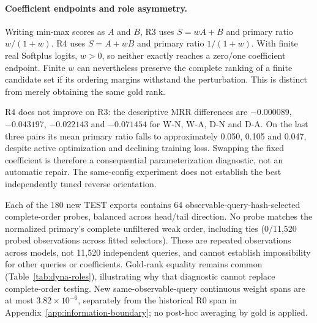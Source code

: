 \documentclass[11pt,a4paper]{article}
\begin{document}
\paragraph{Coefficient endpoints and role asymmetry.}
Writing min-max scores as $A$ and $B$, R3 uses $S=wA+B$ and primary ratio $w/(1+w)$. R4 uses $S=A+wB$ and primary ratio $1/(1+w)$. With finite real Softplus logits, $w>0$, so neither exactly reaches a zero/one coefficient endpoint. Finite $w$ can nevertheless preserve the complete ranking of a finite candidate set if its ordering margins withstand the perturbation. This is distinct from merely obtaining the same gold rank.

R4 does not improve on R3: the descriptive MRR differences are $-0.000089$, $-0.043197$, $-0.022143$ and $-0.071454$ for W-N, W-A, D-N and D-A. On the last three pairs its mean primary ratio falls to approximately 0.050, 0.105 and 0.047, despite active optimization and declining training loss. Swapping the fixed coefficient is therefore a consequential parameterization diagnostic, not an automatic repair. The same-config experiment does not establish the best independently tuned reverse orientation.


Each of the 180 new TEST exports contains 64 observable-query-hash-selected complete-order probes, balanced across head/tail direction. No probe matches the normalized primary's complete unfiltered weak order, including ties (0/11,520 probed observations across fitted selectors). These are repeated observations across models, not 11,520 independent queries, and cannot establish impossibility for other queries or coefficients. Gold-rank equality remains common (Table~\ref{tab:dyna-roles}), illustrating why that diagnostic cannot replace complete-order testing. New same-observable-query continuous weight spans are at most $3.82\times10^{-6}$, separately from the historical R0 span in Appendix~\ref{app:information-boundary}; no post-hoc averaging by gold is applied.
\end{document}
